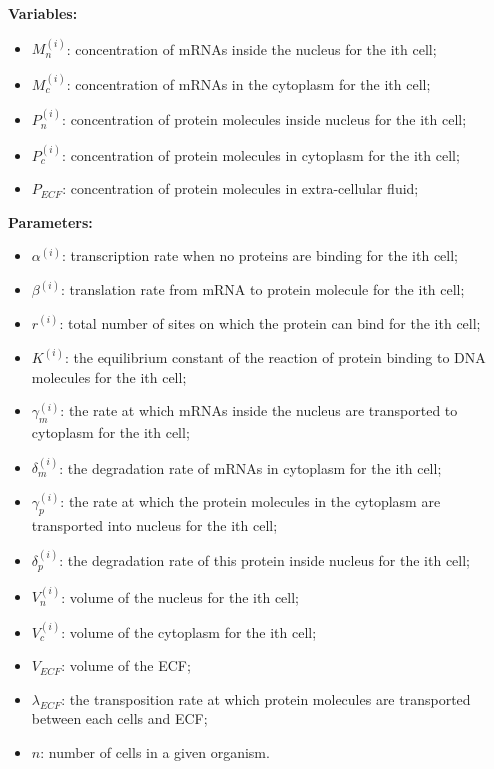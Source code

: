 \documentclass[12pt]{article}
\renewcommand{\(}{\left (}
\renewcommand{\)}{\right )}
\begin{document}
\textbf{Variables: \\}
\begin{itemize}
    \item $M_n^{(i)}$: concentration of mRNAs inside the nucleus for the ith cell;
    \item $M_c^{(i)}$: concentration of mRNAs in the cytoplasm for the ith cell;
    \item $P_n^{(i)}$: concentration of protein molecules inside nucleus for the ith cell;
    \item $P_c^{(i)}$: concentration of protein molecules in cytoplasm for the ith cell;
    \item $P_{ECF}$: concentration of protein molecules in extra-cellular fluid;
\end{itemize}
\textbf{\hspace{5mm} Parameters: \\}
\begin{itemize}
    \item $\alpha^{(i)}$: transcription rate when no proteins are binding for the ith cell;
    \item $\beta^{(i)}$: translation rate from mRNA to protein molecule for the ith cell;
    \item $r^{(i)}$: total number of sites on which the protein can bind for the ith cell;
    \item $K^{(i)}$: the equilibrium constant of the reaction of protein binding to DNA molecules for the ith cell;
    \item $\gamma_m^{(i)}$: the rate at which mRNAs inside the nucleus are transported to cytoplasm for the ith cell;
    \item $\delta_m^{(i)}$: the degradation rate of mRNAs in cytoplasm for the ith cell;
    \item $\gamma_p^{(i)}$: the rate at which the protein molecules in the cytoplasm are transported into nucleus for the ith cell;
    \item $\delta_p^{(i)}$: the degradation rate of this protein inside nucleus for the ith cell;
    \item $V_n^{(i)}$: volume of the nucleus for the ith cell;
    \item $V_c^{(i)}$: volume of the cytoplasm for the ith cell;
    \item $V_{ECF}$: volume of the ECF;
    \item $\lambda_{ECF}$: the transposition rate at which protein molecules are transported between each cells and ECF;
    \item $n$: number of cells in a given organism.
\end{itemize}
\end{document}
